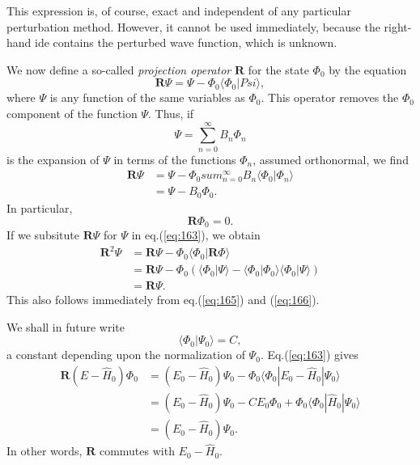 This expression is, of course, exact and independent of any particular perturbation method. However, it cannot be used immediately, because the right-hand ide contains the perturbed wave function, which is unknown.

We now define a so-called \textit{projection operator} $\mathbf{R}$ for the state $\Phi_0$ by the equation
\begin{equation}
\label{eq:163}
\mathbf{R} \Psi = \Psi - \Phi_0 \langle \Phi_0 | Psi\rangle,
\end{equation}
where  $\Psi$ is any function of the same variables as $\Phi_0$. This operator removes the $\Phi_0$ component of the function $\Psi$. Thus, if
\begin{equation}
\nonumber
\Psi = \sum_{n=0}^{\infty} B_n \Phi_n
\end{equation}
is the expansion of $\Psi$ in terms of the functions $\Phi_n$, assumed orthonormal, we find
\begin{align}
\label{eq:165}
\mathbf{R} \Psi &= \Psi - \Phi_0 sum_{n=0}^{\infty} B_n \langle \Phi_0 | \Phi_n \rangle \\ \nonumber
 &= \Psi -B_0 \Phi_0.
\end{align}
In particular,
\begin{equation}
\label{eq:166}
\mathbf{R} \Phi_0 = 0.
\end{equation}
If we subsitute $\mathbf{R} \Psi$ for $\Psi$ in eq.(\ref{eq:163}), we obtain
\begin{align}
\nonumber
\mathbf{R}^2 \Psi &= \mathbf{R}\Psi - \Phi_0  \langle \Phi_0 | \mathbf{R} \Phi \rangle \\
  &= \mathbf{R} \Psi - \Phi_0 \left( \langle \Phi_0 | \Psi \rangle - \langle \Phi_0 | \Phi_0 \rangle \langle \Phi_0 |\Psi \rangle \right) \\ \nonumber
&= \mathbf{R} \Psi. \nonumber
\end{align}
This also follows immediately from eq.(\ref{eq:165}) and (\ref{eq:166}).

We shall in future write
\begin{equation}
\nonumber
\langle \Phi_0 | \Psi_0 \rangle = C,
\end{equation}
a constant depending upon the normalization of $\Psi_0$. Eq.(\ref{eq:163}) gives
\begin{align}
\nonumber
\mathbf{R} (E- \hat{H}_0) \Phi_0 &= (E_0 - \hat{H}_0) \Psi_0 - \Phi_0  \langle \Phi_0 | E_0 - \hat{H}_0|\Psi_0 \rangle \\
&= (E_0 - \hat{H}_0) \Psi_0 - C E_0 \Phi_0 + \Phi_0 \langle \Phi_0 | \hat{H}_0|\Psi_0 \rangle \\ \nonumber
&= (E_0 - \hat{H}_0) \Psi_0. \nonumber
\end{align}
In other words, $\mathbf{R}$ commutes with $E_0-\hat{H}_0$.

